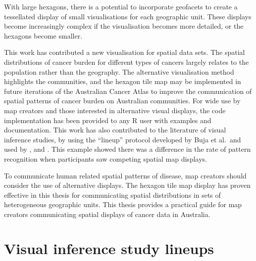 \documentclass{monashthesis}
\begin{document}
With large hexagons, there is a potential to incorporate geofacets \autocite{IGF} to create a tessellated display of small visualisations for each geographic unit. These displays become increasingly complex if the visualisation becomes more detailed, or the hexagons become smaller.

This work has contributed a new visualisation for spatial data sets. The spatial distributions of cancer burden for different types of cancers largely relates to the population rather than the geography. The alternative visualisation method highlights the communities, and the hexagon tile map may be implemented in future iterations of the Australian Cancer Atlas to improve the communication of spatial patterns of cancer burden on Australian communities. For wide use by map creators and those interested in alternative visual displays, the code implementation has been provided to any R user with examples and documentation.
This work has also contributed to the literature of visual inference studies, by using the ``lineup'' protocol developed by Buja et al.~and used by \textcite{GIIV}, and \textcite{GTPCCD}. This example showed there was a difference in the rate of pattern recognition when participants saw competing spatial map displays.

To communicate human related spatial patterns of disease, map creators should consider the use of alternative displays. The hexagon tile map display has proven effective in this thesis for communicating spatial distributions in sets of heterogeneous geographic units. This thesis provides a practical guide for map creators communicating spatial displays of cancer data in Australia.

\appendix

\hypertarget{visual-inference-study-lineups}{%
\chapter{Visual inference study lineups}\label{visual-inference-study-lineups}}
\end{document}
